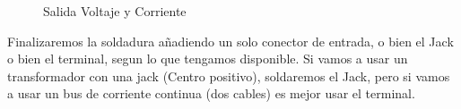 \begin{figure}[h]
    \centering
    \caption{Salida Voltaje y Corriente}
    \label{fig:VccOutConnectors}
\end{figure}

Finalizaremos la soldadura añadiendo un solo conector de entrada, o bien el Jack o bien el terminal, segun lo que tengamos
disponible. Si vamos a usar un transformador con una jack (Centro positivo), soldaremos el Jack, pero si vamos a usar un
bus de corriente continua (dos cables) es mejor usar el terminal.

